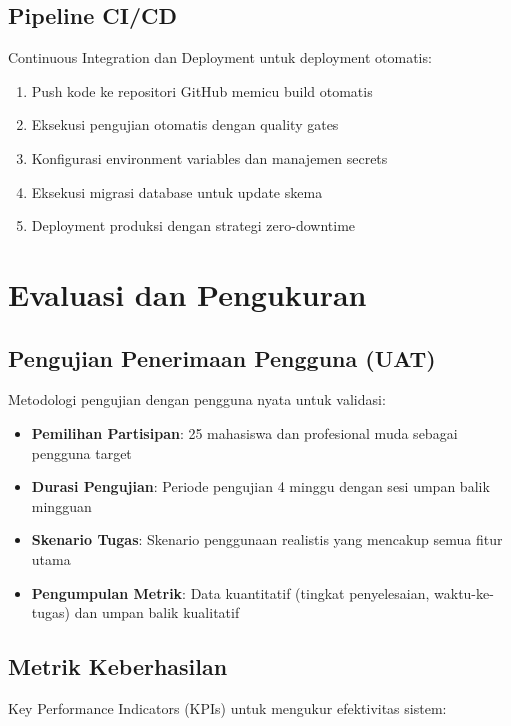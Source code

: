 \subsection{Pipeline CI/CD}

Continuous Integration dan Deployment untuk deployment otomatis:

\begin{enumerate}
\item Push kode ke repositori GitHub memicu build otomatis
\item Eksekusi pengujian otomatis dengan quality gates
\item Konfigurasi environment variables dan manajemen secrets
\item Eksekusi migrasi database untuk update skema
\item Deployment produksi dengan strategi zero-downtime
\end{enumerate}

\section{Evaluasi dan Pengukuran}

\subsection{Pengujian Penerimaan Pengguna (UAT)}

Metodologi pengujian dengan pengguna nyata untuk validasi:

\begin{itemize}
\item \textbf{Pemilihan Partisipan}: 25 mahasiswa dan profesional muda sebagai pengguna target
\item \textbf{Durasi Pengujian}: Periode pengujian 4 minggu dengan sesi umpan balik mingguan
\item \textbf{Skenario Tugas}: Skenario penggunaan realistis yang mencakup semua fitur utama
\item \textbf{Pengumpulan Metrik}: Data kuantitatif (tingkat penyelesaian, waktu-ke-tugas) dan umpan balik kualitatif
\end{itemize}

\subsection{Metrik Keberhasilan}

Key Performance Indicators (KPIs) untuk mengukur efektivitas sistem:

